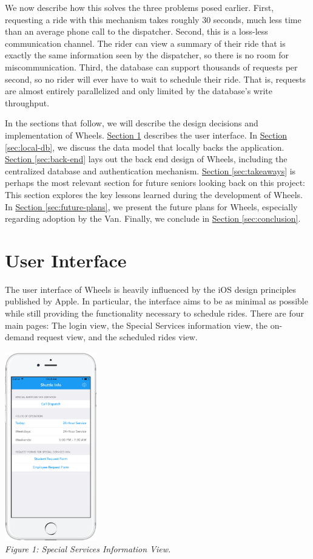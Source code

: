 \documentclass[12pt, a4paper]{article}
\begin{document}
\begin{multicols*}{2}
We now describe how this solves the three problems posed earlier. First, requesting a ride with this mechanism takes roughly 30 seconds, much less time than an average phone call to the dispatcher. Second, this is a loss-less communication channel. The rider can view a summary of their ride that is exactly the same information seen by the dispatcher, so there is no room for miscommunication. Third, the database can support thousands of requests per second, so no rider will ever have to wait to schedule their ride. That is, requests are almost entirely parallelized and only limited by the database's write throughput.

In the sections that follow, we will describe the design decisions and implementation of Wheels. \hyperref[sec:user-interface]{Section \ref{sec:user-interface}} describes the user interface. In \hyperref[sec:local-db]{Section \ref{sec:local-db}}, we discuss the data model that locally backs the application. \hyperref[sec:back-end]{Section \ref{sec:back-end}} lays out the back end design of Wheels, including the centralized database and authentication mechanism. \hyperref[sec:takeaways]{Section \ref{sec:takeaways}} is perhaps the most relevant section for future seniors looking back on this project: This section explores the key lessons learned during the development of Wheels. In \hyperref[sec:future-plans]{Section \ref{sec:future-plans}}, we present the future plans for Wheels, especially regarding adoption by the Van. Finally, we conclude in \hyperref[sec:conclusion]{Section \ref{sec:conclusion}}.
\section{User Interface}\label{sec:user-interface}
The user interface of Wheels is heavily influenced by the iOS design principles published by Apple. In particular, the interface aims to be as minimal as possible while still providing the functionality necessary to schedule rides. There are four main pages: The login view, the Special Services information view, the on-demand request view, and the scheduled rides view.
\begin{center}
	\includegraphics[keepaspectratio=true, width=0.30\textwidth]{screenshot-5.png}\\
	\textit{Figure 1: Special Services Information View.}
\end{center}


\end{multicols*}
\end{document}

